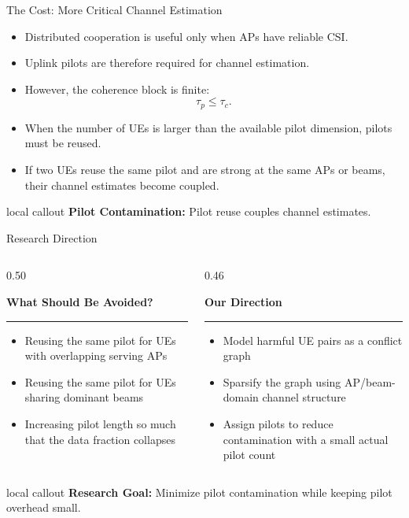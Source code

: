 \documentclass[aspectratio=169, 10pt]{beamer}
\newcommand{\slideheading}[1]{%
    \par\vspace{0.08cm}%
    \settowidth{\dimen0}{\bfseries\large #1}%
    {\bfseries\large #1}%
    \par\vspace{0.015cm}%
    {\color{black}\rule{\dimen0}{0.7pt}}%
    \par\vspace{0.16cm}%
}
\newcommand{\slidecallout}[2]{%
    \vspace{0.08cm}%
    \begin{beamercolorbox}[wd=\linewidth,sep=0.55ex,leftskip=0.8ex,rightskip=0.8ex,rounded=true]{local callout}
        \small{\color{ku_crimson}\bfseries #1:} #2
    \end{beamercolorbox}%
}
\begin{document}
\begin{frame}{The Cost: More Critical Channel Estimation}
    \begin{itemize}
        \setlength{\itemsep}{0.9em}
        \item Distributed cooperation is useful only when APs have reliable CSI.
        \item Uplink pilots are therefore required for channel estimation.
        \item However, the coherence block is finite:
        \[
            \tau_p \le \tau_c.
        \]
        \item When the number of UEs is larger than the available pilot dimension, pilots must be reused.
        \item If two UEs reuse the same pilot and are strong at the same APs or beams, their channel estimates become coupled.
    \end{itemize}

    \vspace{0.15cm}
    \slidecallout{Pilot Contamination}{Pilot reuse couples channel estimates.}
\end{frame}

\begin{frame}{Research Direction}
    \begin{columns}[T,onlytextwidth]
        \begin{column}{0.50\textwidth}
            \slideheading{What Should Be Avoided?}
            \begin{itemize}
                \setlength{\itemsep}{0.8em}
                \item Reusing the same pilot for UEs with overlapping serving APs
                \item Reusing the same pilot for UEs sharing dominant beams
                \item Increasing pilot length so much that the data fraction collapses
            \end{itemize}
        \end{column}
        \begin{column}{0.46\textwidth}
            \slideheading{Our Direction}
            \begin{itemize}
                \setlength{\itemsep}{0.8em}
                \item Model harmful UE pairs as a conflict graph
                \item Sparsify the graph using AP/beam-domain channel structure
                \item Assign pilots to reduce contamination with a small actual pilot count
            \end{itemize}
        \end{column}
    \end{columns}

    \slidecallout{Research Goal}{Minimize pilot contamination while keeping pilot overhead small.}
\end{frame}
\end{document}

